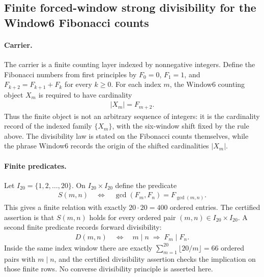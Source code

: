 
\subsection{Finite forced-window strong divisibility for the Window6 Fibonacci counts}
\label{sec:window6-fib-gcd-strong-divisibility-law}

\paragraph{Carrier.}
The carrier is a finite counting layer indexed by nonnegative integers. Define the Fibonacci numbers from first principles by $F_0=0$, $F_1=1$, and $F_{k+2}=F_{k+1}+F_k$ for every $k\geq 0$. For each index $m$, the Window6 counting object $X_m$ is required to have cardinality
$$
\begin{aligned}
|X_m|=F_{m+2}.
\end{aligned}
$$
Thus the finite object is not an arbitrary sequence of integers: it is the cardinality record of the indexed family $\{X_m\}$, with the six-window shift fixed by the rule above. The divisibility law is stated on the Fibonacci counts themselves, while the phrase Window6 records the origin of the shifted cardinalities $|X_m|$.

\paragraph{Finite predicates.}
Let $I_{20}=\{1,2,\ldots,20\}$. On $I_{20}\times I_{20}$ define the predicate
$$
\begin{aligned}
S(m,n) \quad\Longleftrightarrow\quad \gcd(F_m,F_n)=F_{\gcd(m,n)}.
\end{aligned}
$$
This gives a finite relation with exactly $20\cdot 20=400$ ordered entries. The certified assertion is that $S(m,n)$ holds for every ordered pair $(m,n)\in I_{20}\times I_{20}$. A second finite predicate records forward divisibility:
$$
\begin{aligned}
D(m,n) \quad\Longleftrightarrow\quad m\mid n \;\Longrightarrow\; F_m\mid F_n.
\end{aligned}
$$
Inside the same index window there are exactly $\sum_{m=1}^{20}\lfloor 20/m\rfloor=66$ ordered pairs with $m\mid n$, and the certified divisibility assertion checks the implication on those finite rows. No converse divisibility principle is asserted here.


